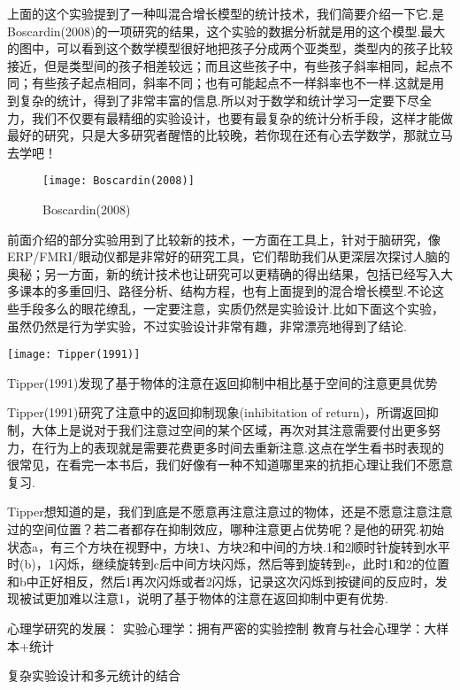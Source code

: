 上面的这个实验提到了一种叫混合增长模型的统计技术，我们简要介绍一下它.是Boscardin(2008)的一项研究的结果，这个实验的数据分析就是用的这个模型.最大的图中，可以看到这个数学模型很好地把孩子分成两个亚类型，类型内的孩子比较接近，但是类型间的孩子相差较远；而且这些孩子中，有些孩子斜率相同，起点不同；有些孩子起点相同，斜率不同；也有可能起点不一样斜率也不一样.这就是用到复杂的统计，得到了非常丰富的信息.所以对于数学和统计学习一定要下尽全力，我们不仅要有最精细的实验设计，也要有最复杂的统计分析手段，这样才能做最好的研究，只是大多研究者醒悟的比较晚，若你现在还有心去学数学，那就立马去学吧！

\begin{figure*}
	\texttt{[image: Boscardin(2008)]}
	\caption{Boscardin(2008)}
\end{figure*}


前面介绍的部分实验用到了比较新的技术，一方面在工具上，针对于脑研究，像ERP/FMRI/眼动仪都是非常好的研究工具，它们帮助我们从更深层次探讨人脑的奥秘；另一方面，新的统计技术也让研究可以更精确的得出结果，包括已经写入大多课本的多重回归、路径分析、结构方程，也有上面提到的混合增长模型.不论这些手段多么的眼花缭乱，一定要注意，实质仍然是实验设计.比如下面这个实验，虽然仍然是行为学实验，不过实验设计非常有趣，非常漂亮地得到了结论.

\begin{marginfigure}
	\texttt{[image: Tipper(1991)]}
	\caption{Tipper(1991)发现了基于物体的注意在返回抑制中相比基于空间的注意更具优势}
\end{marginfigure}

Tipper(1991)研究了注意中的返回抑制现象(inhibitation of return)，所谓返回抑制，大体上是说对于我们注意过空间的某个区域，再次对其注意需要付出更多努力，在行为上的表现就是需要花费更多时间去重新注意.这点在学生看书时表现的很常见，在看完一本书后，我们好像有一种不知道哪里来的抗拒心理让我们不愿意复习.

Tipper想知道的是，我们到底是不愿意再注意注意过的物体，还是不愿意注意注意过的空间位置？若二者都存在抑制效应，哪种注意更占优势呢？是他的研究.初始状态a，有三个方块在视野中，方块1、方块2和中间的方块.1和2顺时针旋转到水平时(b)，1闪烁，继续旋转到c后中间方块闪烁，然后等到旋转到e，此时1和2的位置和b中正好相反，然后1再次闪烁或者2闪烁，记录这次闪烁到按键间的反应时，发现被试更加难以注意1，说明了基于物体的注意在返回抑制中更有优势.

心理学研究的发展：
实验心理学：拥有严密的实验控制
教育与社会心理学：大样本+统计

复杂实验设计和多元统计的结合

